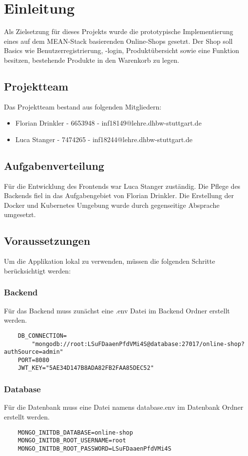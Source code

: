 
\chapter{Einleitung}\label{ch:einleitung}
Als Zielsetzung für dieses Projekts wurde die prototypische Implementierung eines auf dem MEAN-Stack basierenden Online-Shops gesetzt. Der Shop soll Basics wie Benutzerregistrierung, -login, Produktübersicht sowie eine Funktion besitzen, bestehende Produkte in den Warenkorb zu legen.
\section{Projektteam}\label{sec:projektteam}
Das Projektteam bestand aus folgenden Mitgliedern:
\begin{itemize}
	\item Florian Drinkler - 6653948 - inf18149@lehre.dhbw-stuttgart.de
	\item Luca Stanger - 7474265 - inf18244@lehre.dhbw-stuttgart.de
\end{itemize}
\section{Aufgabenverteilung}\label{sec:aufgabenverteilung}
Für die Entwicklung des Frontends war Luca Stanger zuständig. Die Pflege des Backends fiel in das Aufgabengebiet von Florian Drinkler. Die Erstellung der Docker und Kubernetes Umgebung wurde durch gegenseitige Absprache umgesetzt.
\newpage
\section{Voraussetzungen}
Um die Applikation lokal zu verwenden, müssen die folgenden Schritte berücksichtigt werden:

\subsection*{Backend}
Für das Backend muss zunächst eine .env Datei im Backend Ordner erstellt werden. 

\begin{verbatim}
	DB_CONNECTION=
		"mongodb://root:LSuFDaaenPfdVMi4S@database:27017/online-shop?authSource=admin"
	PORT=8080
	JWT_KEY="5AE34D147B8ADA82FB2FAA85DEC52"
\end{verbatim}

\subsection*{Database}
Für die Datenbank muss eine Datei namens database.env im Datenbank Ordner erstellt werden.
\begin{verbatim}
	MONGO_INITDB_DATABASE=online-shop
	MONGO_INITDB_ROOT_USERNAME=root
	MONGO_INITDB_ROOT_PASSWORD=LSuFDaaenPfdVMi4S
\end{verbatim}

